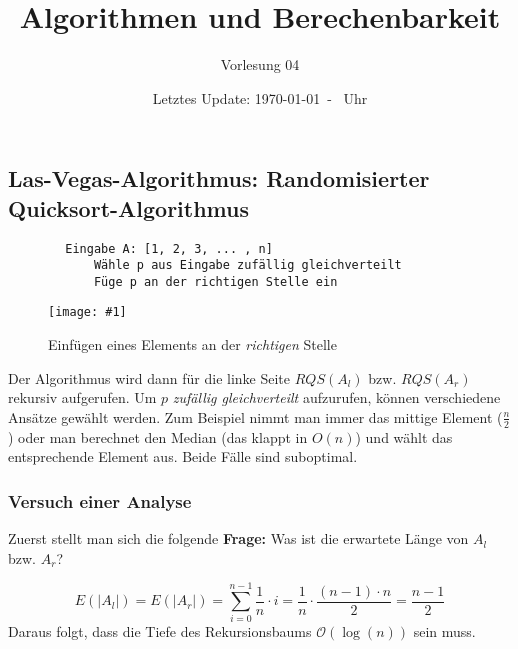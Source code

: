 \documentclass{scrartcl}%
\newcommand{\includepic}[2]{\texttt{[image: \#1]}}
\begin{document}
    \subject{Vorlesungsmitschrieb}
    \title{Algorithmen und Berechenbarkeit}
    \subtitle{Vorlesung 04}
    \date{Letztes Update: \today \ - \currenttime \ Uhr}
    \maketitle


    \subsection*{Las-Vegas-Algorithmus: Randomisierter Quicksort-Algorithmus}
    \label{subsec:las-vegas-algorithmus:RandomisierterQuicksort-algorithmus}

    \begin{lstlisting}
        Eingabe A: [1, 2, 3, ... , n]
            Wähle p aus Eingabe zufällig gleichverteilt
            Füge p an der richtigen Stelle ein
    \end{lstlisting}

    \begin{figure}[htb]
        \centering
        \includepic{lec_04_a}{0.45}
        \caption{Einfügen eines Elements an der \textit{richtigen} Stelle}
    \end{figure}
    Der Algorithmus wird dann für die linke Seite $RQS(A_l)$ bzw. $RQS(A_r)$ rekursiv aufgerufen.
    Um $p$ \textit{zufällig gleichverteilt} aufzurufen, können verschiedene Ansätze gewählt werden.
    Zum Beispiel nimmt man immer das mittige Element ($\frac{n}{2}$)
    oder man berechnet den Median (das klappt in $O(n)$) und wählt das entsprechende Element aus.
    Beide Fälle sind suboptimal.

    \subsubsection*{Versuch einer Analyse}
    Zuerst stellt man sich die folgende \textbf{\textsf{Frage:}} Was ist die erwartete Länge von $A_l$ bzw. $A_r$?

    \begin{equation*}
        E(|A_l|) = E(|A_r|)= \sum^{n-1}_{i = 0}\frac{1}{n} \cdot i = \frac{1}{n} \cdot \frac{(n-1) \cdot n}{2} = \frac{n -1}{2}
    \end{equation*}
    Daraus folgt, dass die Tiefe des Rekursionsbaums  $\mathcal{O}(\log(n))$ sein muss.
\end{document}
